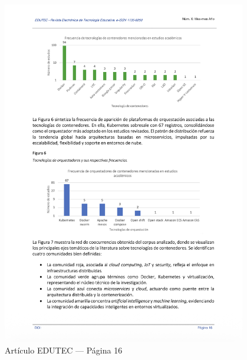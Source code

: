 \begin{figure}[H]
    \centering
    \begin{tcolorbox}[
        colback=white,
        colframe=gray!50,
        boxrule=1pt,
        arc=2pt,
        boxsep=5pt,
        left=3pt,
        right=3pt,
        top=3pt,
        bottom=3pt,
        drop shadow
    ]
        \includegraphics[width=0.95\textwidth,keepaspectratio]{apendices/EDUTEC/16.png}
    \end{tcolorbox}
    \caption{Artículo EDUTEC --- Página 16}\label{fig:edutec-pagina-16}
\end{figure}
\FloatBarrier

